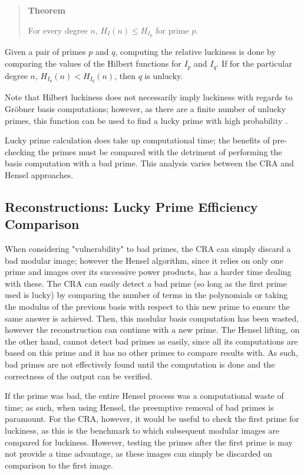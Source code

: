\documentclass[letterpaper,12pt,titlepage,oneside,final]{book}
\newenvironment{theorem}{\begin{quote}%
  \textbf{Theorem }%
  \quad
}{%
\end{quote}%
}
\begin{document}
\begin{theorem}
  For every degree ${n}$, ${H_I(n) \leq H_{I_p}}$ for prime ${p}$.
\end{theorem}

Given a pair of primes ${p}$ and ${q}$, computing the relative luckiness is done by comparing the values of the Hilbert functions for ${I_p}$ and ${I_q}$.  If for the particular degree ${n}$, ${H_{I_p}(n) < H_{I_q}(n)}$, then ${q}$ is unlucky.  

Note that Hilbert luckiness does not necessarily imply luckiness with regards to Gr\"obner basis computations; however, as there are a finite number of unlucky primes, this function can be used to find a lucky prime with high probability \cite{Arnold}.   

Lucky prime calculation does take up computational time; the benefits of pre-checking the primes must be compared with the detriment of performing the basis computation with a bad prime.  This analysis varies between the CRA and Hensel approaches. 

\subsection{Reconstructions: Lucky Prime Efficiency Comparison}

When considering "vulnerability" to bad primes, the CRA can simply discard a bad modular image; however the Hensel algorithm, since it relies on only one prime and images over its successive power products, has a harder time dealing with these.  The CRA can easily detect a bad prime (so long as the first prime used is lucky) by comparing the number of terms in the polynomials or taking the modulus of the previous basis with respect to this new prime to ensure the same answer is achieved.  Then, this modular basis computation has been wasted, however the reconstruction can continue with a new prime.  The Hensel lifting, on the other hand, cannot detect bad primes as easily, since all its computations are based on this prime and it has no other primes to compare results with.  As such, bad primes are not effectively found until the computation is done and the correctness of the output can be verified.  

If the prime was bad, the entire Hensel process was a computational waste of time; as such, when using Hensel, the preemptive removal of bad primes is paramount.  For the CRA, however, it would be useful to check the first prime for luckiness, as this is the benchmark to which subsequent modular images are compared for luckiness.  However, testing the primes after the first prime is may not provide a time advantage, as these images can simply be discarded on comparison to the first image.
\end{document}
